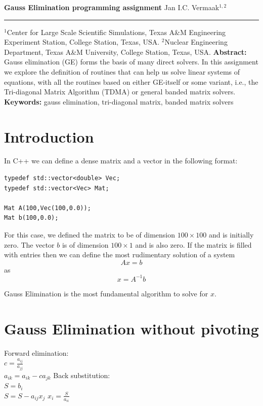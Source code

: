 \documentclass[10pt,letterpaper,notitlepage]{article}
\newcommand{\DOCTITLE}{Gauss Elimination programming assignment}
\begin{document}
\noindent
{\LARGE\textbf{\DOCTITLE}}
\newline
\newline
\newline
\noindent
{\Large Jan I.C. Vermaak$^{1,2}$}
\newline
\noindent\rule{\textwidth}{1pt}
{\small $^1$Center for Large Scale Scientific Simulations, Texas A\&M Engineering Experiment Station, College Station, Texas, USA.}
\newline\noindent
{\small $^2$Nuclear Engineering Department, Texas A\&M University, College Station, Texas, USA.}
\newline
\newline
\textbf{Abstract:}\newline\noindent
Gauss elimination (GE) forms the basis of many direct solvers. In this assignment we explore the definition of routines that can help us solve linear systems of equations, with all the routines based on either GE-itself or some variant, i.e., the Tri-diagonal Matrix Algorithm (TDMA) or general banded matrix solvers.
\newline
\newline\noindent
{\small
\textbf{Keywords:} gauss elimination, tri-diagonal matrix, banded matrix solvers}

\section{Introduction}
In C++ we can define a dense matrix and a vector in the following format:
\begin{verbatim}
typedef std::vector<double> Vec;
typedef std::vector<Vec> Mat;

Mat A(100,Vec(100,0.0));
Mat b(100,0.0);
\end{verbatim}

\noindent
For this case, we defined the matrix to be of dimension $100{\times}100$ and is initially zero. The vector $b$ is of dimension $100{\times}1$ and is also zero. If the matrix is filled with entries then we can define the most rudimentary solution of a system
$$
Ax = b
$$ 
as
$$
x = A^{-1}b
$$

\noindent
Gauss Elimination is the most fundamental algorithm to solve for $x$.

\section{Gauss Elimination without pivoting}

\begin{algorithm}
\caption{Gauss elimination without pivoting}
Forward elimination:\\
{
	{
		$c = \frac{a_{ij}}{a_{jj}}$\\
		{
			$a_{ik} = a_{ik} - c a_{jk}$
		} 
	}
}
Back substitution:\\
{
	$S = b_i$\\
	{
		$S = S - a_{ij}x_j$
	}
	$x_i = \frac{S}{a_{ii}}$
}
\end{algorithm}
\end{document}
